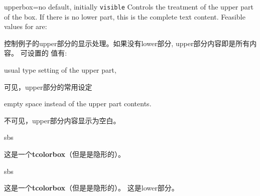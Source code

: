 \begin{docTcbKey}[][doc new=2015-01-06]{upperbox}{=}{no default, initially \texttt{visible}}
Controls the treatment of the upper part of the box. If there is no lower part,  this is the complete text content.
Feasible values for  are:

控制例子的upper部分的显示处理。如果没有lower部分, upper部分内容即是所有内容。
可设置的  值有:
\begin{DescriptionL}{}
\item[\docValue{visible}]usual type setting of the upper part,
\par 可见，upper部分的常用设定
\item[\docValue{invisible}] empty space instead of the upper part contents.
\par 不可见，upper部分内容显示为空白。
\end{DescriptionL}


\begin{dispExample*}{sbs}
\begin{tcolorbox}[upperbox=invisible%
,colback=white%
,title=upperbox设置为invisible%
且没有lower部分]
这是一个\textbf{tcolorbox}（但是是隐形的）。
\end{tcolorbox}
\end{dispExample*}

\begin{dispExample*}{sbs}
\begin{tcolorbox}[upperbox=invisible%
,colback=white%
,title=upperbox设置为invisible%
时只显示lower部分]
这是一个\textbf{tcolorbox}（但是是隐形的）。
\tcblower
这是lower部分。
\end{tcolorbox}
\end{dispExample*}
 
\end{docTcbKey}


